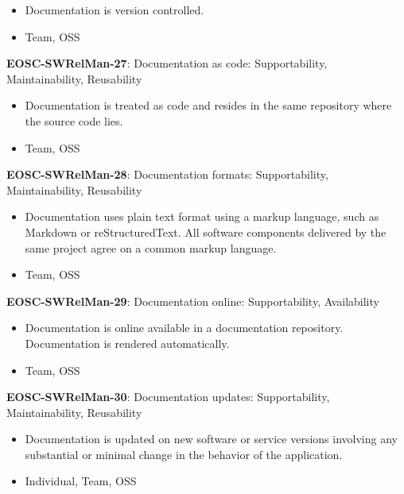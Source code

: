 \begin{itemize}
    \item Documentation is version controlled. \cite{orviz_fernandez_eosc-synergy_2020}
    \item Team, OSS
\end{itemize}

\textbf{EOSC-SWRelMan-27}: Documentation as code: Supportability, Maintainability, Reusability

\begin{itemize}
    \item Documentation is treated as code and resides in the same repository where the source code lies. \cite{orviz_set_2017}
    \item Team, OSS
\end{itemize}

\textbf{EOSC-SWRelMan-28}: Documentation formats: Supportability, Maintainability, Reusability

\begin{itemize}
    \item Documentation uses plain text format using a markup language, such as Markdown or reStructuredText. All software components delivered by the same project agree on a common markup language. \cite{orviz_set_2017,raymond_software_2013}
    \item Team, OSS
\end{itemize}

\textbf{EOSC-SWRelMan-29}: Documentation online: Supportability, Availability

\begin{itemize}
    \item Documentation is online available in a documentation repository. Documentation is rendered automatically. \cite{orviz_set_2017,orviz_fernandez_eosc-synergy_2020}
    \item Team, OSS
\end{itemize}

\textbf{EOSC-SWRelMan-30}: Documentation updates: Supportability, Maintainability, Reusability

\begin{itemize}
    \item Documentation is updated on new software or service versions involving any substantial or minimal change in the behavior of the application. \cite{orviz_set_2017,orviz_fernandez_eosc-synergy_2020,raymond_software_2013}
    \item Individual, Team, OSS
\end{itemize}

